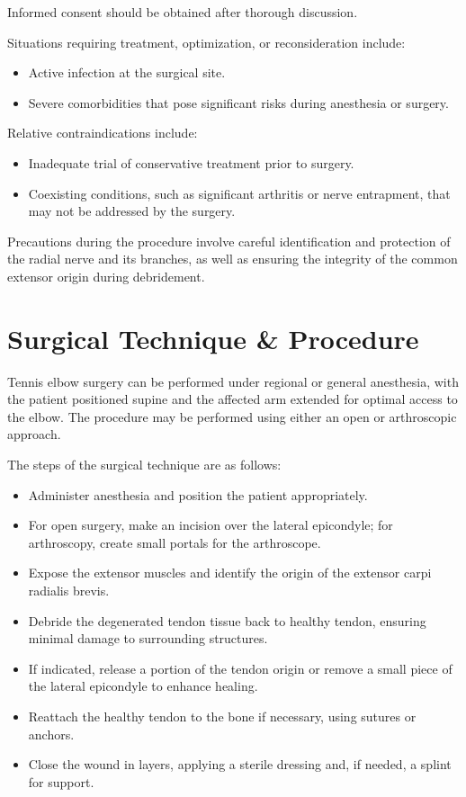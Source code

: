 Informed consent should be obtained after thorough discussion.

Situations requiring treatment, optimization, or reconsideration include:

\begin{itemize}
  \item Active infection at the surgical site.
  \item Severe comorbidities that pose significant risks during anesthesia or surgery.
\end{itemize}

Relative contraindications include:

\begin{itemize}
  \item Inadequate trial of conservative treatment prior to surgery.
  \item Coexisting conditions, such as significant arthritis or nerve entrapment, that may not be addressed by the surgery.
\end{itemize}

Precautions during the procedure involve careful identification and protection of the radial nerve and its branches, as well as ensuring the integrity of the common extensor origin during debridement.

\section*{Surgical Technique \& Procedure}
Tennis elbow surgery can be performed under regional or general anesthesia, with the patient positioned supine and the affected arm extended for optimal access to the elbow. The procedure may be performed using either an open or arthroscopic approach.

The steps of the surgical technique are as follows:

\begin{itemize}
  \item Administer anesthesia and position the patient appropriately.
  \item For open surgery, make an incision over the lateral epicondyle; for arthroscopy, create small portals for the arthroscope.
  \item Expose the extensor muscles and identify the origin of the extensor carpi radialis brevis.
  \item Debride the degenerated tendon tissue back to healthy tendon, ensuring minimal damage to surrounding structures.
  \item If indicated, release a portion of the tendon origin or remove a small piece of the lateral epicondyle to enhance healing.
  \item Reattach the healthy tendon to the bone if necessary, using sutures or anchors.
  \item Close the wound in layers, applying a sterile dressing and, if needed, a splint for support.
\end{itemize}

